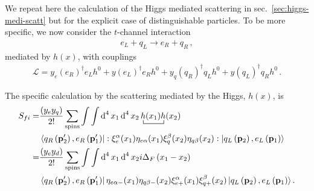 \begin{frame}
We repeat here the calculation of the Higgs mediated scattering in sec.~\ref{sec:higgs-medi-scatt} but for the explicit case of distinguishable particles. To be more specific, 
we now consider the $t$-channel interaction
\begin{align}
  e_L+q_L \to e_R+q_R\,,
\end{align}
mediated by $h(x)$, with couplings
\begin{align}
\label{eq:xietaz}
\mathcal{L}= y_e \left(e_R\right)^{\dagger} e_L h^0 +y \left(e_L\right)^{\dagger} e_R h^0 
+y_q \left(q_R\right)^{\dagger} q_L h^0 +y \left(q_L\right)^{\dagger} q_R h^0 \,.
\end{align}


The specific calculation by the scattering mediated by the Higgs, $h(x)$, is 
\begin{align}
  S_{fi}=&\frac{\left(y_ey_q \right)}{2!}\sum_{\text{spins}}\int\int \operatorname{d}^4x_1 \operatorname{d}^4x_2
\bcontraction{\,}{h}{(x_1)}{h}\,h(x_1)h(x_2) \nonumber\\
&\left\langle q_R \left(\mathbf{p}'_2\right),e_R\left(\mathbf{p}'_1\right) \right|
  : \xi^{\alpha}_{e}(x_1)\eta_{e\alpha}(x_1)
    \xi^{\beta}_{q}(x_2)\eta_{q\beta}(x_2):
 \left| q_L\left(\mathbf{p}_2\right) ,e_L \left(\mathbf{p}_1\right)  \right\rangle \nonumber\\
=&\frac{\left( y_ey_d \right)}{2!}\sum_{\text{spins}}\int\int \operatorname{d}^4x_1 \operatorname{d}^4x_2
i\Delta_F \left( x_1-x_2 \right)\nonumber\\
&\left\langle q_R \left(\mathbf{p}'_2\right),e_R\left(\mathbf{p}'_1\right)\right|
   \eta_{e\alpha-}(x_1)\eta_{q\beta-}(x_2) \xi^{\alpha}_{e+}(x_1)\xi^{\beta}_{q+}(x_2)
 \left| q_L\left(\mathbf{p}_2\right), e_L \left(\mathbf{p}_1\right)\right\rangle. 
\end{align}




\end{frame}
